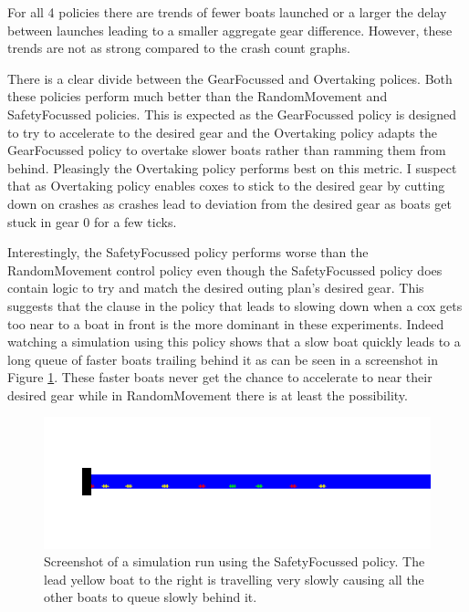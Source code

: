 For all 4 policies there are trends of fewer boats launched or a larger the delay between launches leading to a smaller aggregate gear difference. However, these trends are not as strong compared to the crash count graphs.

There is a clear divide between the GearFocussed and Overtaking polices. Both these policies perform much better than the RandomMovement and SafetyFocussed policies. This is expected as the GearFocussed policy is designed to try to accelerate to the desired gear and the Overtaking policy adapts the GearFocussed policy to overtake slower boats rather than ramming them from behind. Pleasingly the Overtaking policy performs best on this metric. I suspect that as Overtaking policy enables coxes to stick to the desired gear by cutting down on crashes as crashes lead to deviation from the desired gear as boats get stuck in gear 0 for a few ticks.

Interestingly, the SafetyFocussed policy performs worse than the RandomMovement control policy even though the SafetyFocussed policy does contain logic to try and match the desired outing plan's desired gear. This suggests that the clause in the policy that leads to slowing down when a cox gets too near to a boat in front is the more dominant in these experiments. Indeed watching a simulation using this policy shows that a slow boat quickly leads to a long queue of faster boats trailing behind it as can be seen in a screenshot in Figure \ref{experiments:safety_queue_screenshot}. These faster boats never get the chance to accelerate to near their desired gear while in RandomMovement there is at least the possibility.

\begin{figure}
\begin{center}
  \includegraphics[scale=0.5]{images/SafetyFocussedQueue.png}
  \caption{Screenshot of a simulation run using the SafetyFocussed policy. The lead yellow boat to the right is travelling very slowly causing all the other boats to queue slowly behind it.}
  \label{experiments:safety_queue_screenshot}
\end{center}
\end{figure}

